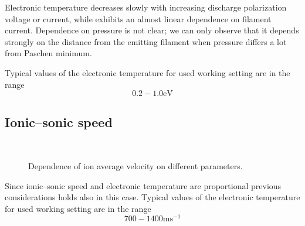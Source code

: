 \documentclass[11pt,a4 paper]{article}
\begin{document}
Electronic temperature decreases slowly with increasing discharge polarization voltage or current, while exhibits an almost linear dependence on filament current. Dependence on pressure is not clear; we can only observe that it depends strongly on the distance from the emitting filament when pressure differs a lot from Paschen minimum.

Typical values of the electronic temperature for used working setting are in the range 
\[0.2-1.0\si\electronvolt\]

\subsection{Ionic--sonic speed}
\begin{figure}[H]
\\%
 \caption{Dependence of ion average velocity on different parameters.}\label{fig:cs}%
\end{figure}%
Since ionic--sonic speed and electronic temperature are proportional previous considerations holds also in this case. 
Typical values of the electronic temperature for used working setting are in the range 
\[700-1400\si{\metre\second^{-1}}\]
\end{document}
